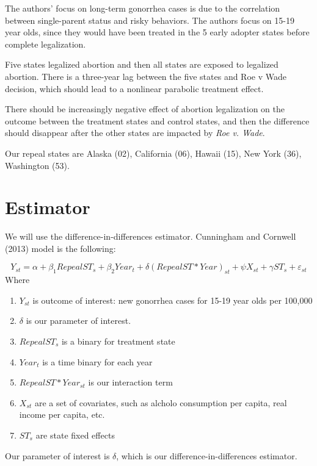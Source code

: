 \documentclass[
]{book}
\providecommand{\tightlist}{%
  \setlength{\itemsep}{0pt}\setlength{\parskip}{0pt}}
\begin{document}
The authors' focus on long-term gonorrhea cases is due to the correlation between single-parent status and risky behaviors. The authors focus on 15-19 year olds, since they would have been treated in the 5 early adopter states before complete legalization.

Five states legalized abortion and then all states are exposed to legalized abortion. There is a three-year lag between the five states and Roe v Wade decision, which should lead to a nonlinear parabolic treatment effect.

There should be increasingly negative effect of abortion legalization on the outcome between the treatment states and control states, and then the difference should disappear after the other states are impacted by \emph{Roe v. Wade}.

Our repeal states are Alaska (02), California (06), Hawaii (15), New York (36), Washington (53).

\section{Estimator}\label{estimator}

We will use the difference-in-differences estimator. Cunningham and Cornwell (2013) model is the following:

\[ Y_{st} = \alpha + \beta_1 RepealST_s + \beta_2 Year_t + \delta (RepealST*Year)_{st}+\psi X_{st}+\gamma ST_s+ \varepsilon_{st} \]
Where

\begin{enumerate}
\def\labelenumi{\arabic{enumi}.}
\tightlist
\item
  \(Y_{st}\) is outcome of interest: new gonorrhea cases for 15-19 year olds per 100,000
\item
  \(\delta\) is our parameter of interest.
\item
  \(RepealST_s\) is a binary for treatment state
\item
  \(Year_t\) is a time binary for each year
\item
  \(RepealST*Year_{st}\) is our interaction term
\item
  \(X_{st}\) are a set of covariates, such as alcholo consumption per capita, real income per capita, etc.
\item
  \(ST_s\) are state fixed effects
\end{enumerate}

Our parameter of interest is \(\delta\), which is our difference-in-differences estimator.
\end{document}
